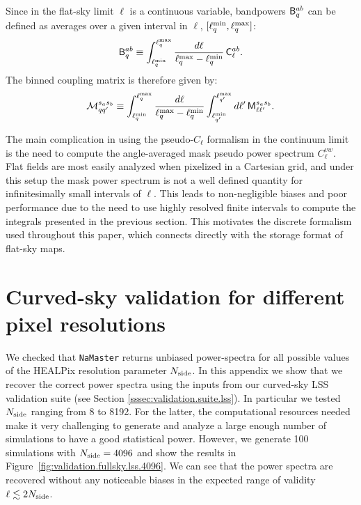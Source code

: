 \documentclass[usenatbib]{mnrasb}
\begin{document}
    Since in the flat-sky limit $\ell$ is a continuous variable, bandpowers ${\sf B}^{ab}_q$ can be defined as averages over a given interval in $\ell$, $[\ell_q^{\rm min},\ell_q^{\rm max}]$:
    \begin{equation}
      {\sf B}^{ab}_q\equiv \int_{\ell_q^{\rm min}}^{\ell_q^{\rm max}} \frac{d\ell}{\ell_q^{\rm max}-\ell_q^{\rm min}}\,{\sf C}^{ab}_\ell.
    \end{equation}
    The binned coupling matrix is therefore given by:
    \begin{equation}
      \mathcal{M}^{s_as_b}_{qq'}\equiv\int^{\ell_q^{\rm max}}_{\ell_q^{\rm min}} \frac{d\ell}{\ell_q^{\rm max}-\ell_q^{\rm min}}\int^{\ell_{q'}^{\rm max}}_{\ell_{q'}^{\rm min}} d\ell'\,{\sf M}^{s_as_b}_{\ell\ell'}.
    \end{equation}

    The main complication in using the pseudo-$C_\ell$ formalism in the continuum limit is the need to compute the angle-averaged mask pseudo power spectrum $C^{vw}_\ell$. Flat fields are most easily analyzed when pixelized in a Cartesian grid, and under this setup the mask power spectrum is not a well defined quantity for infinitesimally small intervals of $\ell$. This leads to non-negligible biases and poor performance \cite{2016arXiv161204664A} due to the need to use highly resolved finite intervals to compute the integrals presented in the previous section. This motivates the discrete formalism used throughout this paper, which connects directly with the storage format of flat-sky maps.

  \section{Curved-sky validation for different pixel resolutions}\label{app:full_sky_nside}
    We checked that \texttt{NaMaster} returns unbiased power-spectra for all possible values of the HEALPix resolution parameter $N_{\rm side}$. In this appendix we show that we recover the correct power spectra using the inputs from our curved-sky LSS validation suite (see Section \ref{sssec:validation.suite.lss}). In particular we tested $N_{\rm side}$ ranging from 8 to 8192. For the latter, the computational resources needed make it very challenging to generate and analyze a large enough number of simulations to have a good statistical power. However, we generate 100 simulations with $N_{\rm side}=4096$ and show the results in Figure~\ref{fig:validation.fullsky.lss.4096}. We can see that the power spectra are recovered without any noticeable biases in the expected range of validity $\ell \lesssim 2 N_{\rm side}$.
\end{document}
